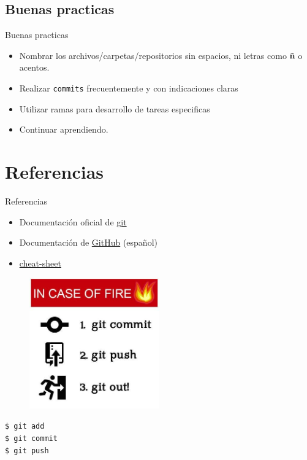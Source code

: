 \documentclass{beamer}
\begin{document}
\subsection {Buenas practicas}
  \begin{frame} {Buenas practicas}
      \begin{itemize}
        \Large
        \item Nombrar los archivos/carpetas/repositorios sin espacios, ni letras como \textbf{ñ} o acentos.
        \item Realizar \texttt{commits} frecuentemente y con indicaciones claras 
        \item Utilizar ramas para desarrollo de tareas especificas
        \item Continuar aprendiendo.
      \end{itemize}
  \end{frame}

  

\section{Referencias}

\begin{frame}{Referencias}

  \begin{itemize}
    \item Documentación oficial de \href{https://git-scm.com}{git} 
    \item Documentación de \href{https://docs.github.com/es}{GitHub} (español)
    \item \href{https://training.github.com/downloads/es_ES/github-git-cheat-sheet/}{cheat-sheet}
  \end{itemize}

\end{frame}

\begin{frame}

\begin{figure}
  \includegraphics[width = 0.5\textwidth]{images/meme-git.jpg}
\end{figure}

\begin{block}{}
  {\texttt{\$ git add  }} \\
  {\texttt{\$ git commit  }} \\
  {\texttt{\$ git push }}
\end{block}

\end{frame}
\end{document}
